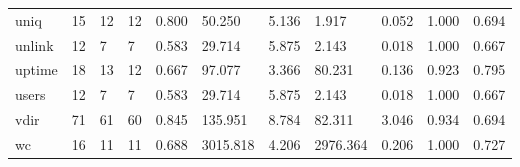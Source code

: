 \begin{longtable}{lp{1.8cm}p{1.8cm}p{1.8cm}p{1.8cm}p{1.8cm}p{1.8cm}p{1.8cm}p{1.8cm}p{1.8cm}p{1.8cm}}
uniq      &                           15 &                 12 &                                12 &                                      0.800 &                                 50.250 &                                        5.136 &                             1.917 &                                   0.052 &                              1.000 &                                              0.694 \\
unlink    &                           12 &                  7 &                                 7 &                                      0.583 &                                 29.714 &                                        5.875 &                             2.143 &                                   0.018 &                              1.000 &                                              0.667 \\
uptime    &                           18 &                 13 &                                12 &                                      0.667 &                                 97.077 &                                        3.366 &                            80.231 &                                   0.136 &                              0.923 &                                              0.795 \\
users     &                           12 &                  7 &                                 7 &                                      0.583 &                                 29.714 &                                        5.875 &                             2.143 &                                   0.018 &                              1.000 &                                              0.667 \\
vdir      &                           71 &                 61 &                                60 &                                      0.845 &                                135.951 &                                        8.784 &                            82.311 &                                   3.046 &                              0.934 &                                              0.694 \\
wc        &                           16 &                 11 &                                11 &                                      0.688 &                               3015.818 &                                        4.206 &                          2976.364 &                                   0.206 &                              1.000 &                                              0.727 \\

\end{longtable}

